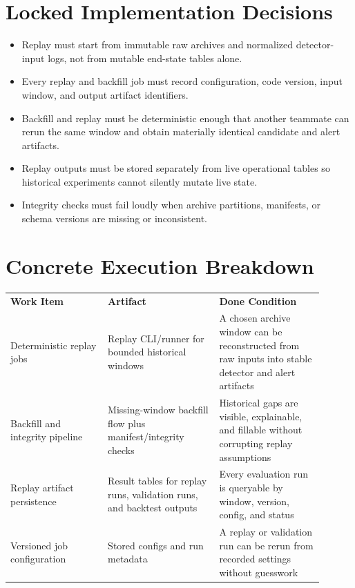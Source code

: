 \documentclass{article}
\begin{document}
\section*{Locked Implementation Decisions}
\begin{itemize}
\item Replay must start from immutable raw archives and normalized detector-input logs, not from mutable end-state tables alone.
\item Every replay and backfill job must record configuration, code version, input window, and output artifact identifiers.
\item Backfill and replay must be deterministic enough that another teammate can rerun the same window and obtain materially identical candidate and alert artifacts.
\item Replay outputs must be stored separately from live operational tables so historical experiments cannot silently mutate live state.
\item Integrity checks must fail loudly when archive partitions, manifests, or schema versions are missing or inconsistent.
\end{itemize}

\section*{Concrete Execution Breakdown}
\begin{longtable}{p{0.28\linewidth}p{0.32\linewidth}p{0.30\linewidth}}
\textbf{Work Item} & \textbf{Artifact} & \textbf{Done Condition} \\
Deterministic replay jobs & Replay CLI/runner for bounded historical windows & A chosen archive window can be reconstructed from raw inputs into stable detector and alert artifacts \\
Backfill and integrity pipeline & Missing-window backfill flow plus manifest/integrity checks & Historical gaps are visible, explainable, and fillable without corrupting replay assumptions \\
Replay artifact persistence & Result tables for replay runs, validation runs, and backtest outputs & Every evaluation run is queryable by window, version, config, and status \\
Versioned job configuration & Stored configs and run metadata & A replay or validation run can be rerun from recorded settings without guesswork \\
\end{longtable}
\end{document}
